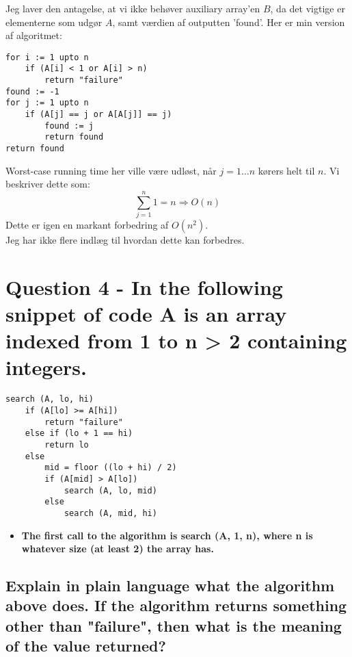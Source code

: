 \documentclass[a4paper,12pt]{article}
\begin{document}
Jeg laver den antagelse, at vi ikke behøver auxiliary array'en $B$, da det vigtige er elementerne som udgør $A$, samt værdien af outputten 'found'.
Her er min version af algoritmet:
\begin{lstlisting}
for i := 1 upto n                   
    if (A[i] < 1 or A[i] > n)       
        return "failure"            
found := -1                         
for j := 1 upto n                   
    if (A[j] == j or A[A[j]] == j)  
        found := j                  
        return found                
return found                        
\end{lstlisting}
Worst-case running time her ville være udløst, når $j=1\dots n$ kørers helt til $n$. Vi beskriver dette som:
\[\sum_{j=1}^{n}1 = n \Rightarrow O(n)\]
Dette er igen en markant forbedring af $O(n^2)$.\\
Jeg har ikke flere indlæg til hvordan dette kan forbedres.

\section[Question 4]{Question 4 - In the following snippet of code A is an array indexed from 1 to n > 2 containing integers.}

\begin{lstlisting}
search (A, lo, hi)
    if (A[lo] >= A[hi])
        return "failure"
    else if (lo + 1 == hi)
        return lo
    else 
        mid = floor ((lo + hi) / 2)
        if (A[mid] > A[lo])
            search (A, lo, mid)
        else
            search (A, mid, hi)
\end{lstlisting}
\begin{itemize}
    \item[] \textbf{The first call to the algorithm is search (A, 1, n), where n is whatever size (at least 2) the
    array has.}
\end{itemize}

\subsection[]{Explain in plain language what the algorithm above does. If the algorithm returns something other than "failure", then what is the meaning of the value returned?}
    
\end{document}
